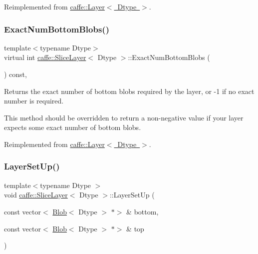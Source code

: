 Reimplemented from \mbox{\hyperlink{classcaffe_1_1_layer_a8e5ee0494d85f5f55fc4396537cbc60f}{caffe\+::\+Layer$<$ Dtype $>$}}.

\mbox{\label{classcaffe_1_1_slice_layer_abfc6e86b0b22c156ddc350168cd7757b}} 
\subsubsection{\texorpdfstring{Exact\+Num\+Bottom\+Blobs()}{ExactNumBottomBlobs()}\hspace{0.1cm}{\footnotesize\ttfamily [2/2]}}
{\footnotesize\ttfamily template$<$typename Dtype$>$ \\
virtual int \mbox{\hyperlink{classcaffe_1_1_slice_layer}{caffe\+::\+Slice\+Layer}}$<$ Dtype $>$\+::Exact\+Num\+Bottom\+Blobs (\begin{DoxyParamCaption}{ }\end{DoxyParamCaption}) const\hspace{0.3cm}{\ttfamily [inline]}, {\ttfamily [virtual]}}



Returns the exact number of bottom blobs required by the layer, or -\/1 if no exact number is required. 

This method should be overridden to return a non-\/negative value if your layer expects some exact number of bottom blobs. 

Reimplemented from \mbox{\hyperlink{classcaffe_1_1_layer_a8e5ee0494d85f5f55fc4396537cbc60f}{caffe\+::\+Layer$<$ Dtype $>$}}.

\mbox{\label{classcaffe_1_1_slice_layer_a92c1cdabdce4c92b9a4ee58e2ceb601e}} 
\subsubsection{\texorpdfstring{Layer\+Set\+Up()}{LayerSetUp()}\hspace{0.1cm}{\footnotesize\ttfamily [1/2]}}
{\footnotesize\ttfamily template$<$typename Dtype $>$ \\
void \mbox{\hyperlink{classcaffe_1_1_slice_layer}{caffe\+::\+Slice\+Layer}}$<$ Dtype $>$\+::Layer\+Set\+Up (\begin{DoxyParamCaption}\item[{const vector$<$ \mbox{\hyperlink{classcaffe_1_1_blob}{Blob}}$<$ Dtype $>$ $\ast$$>$ \&}]{bottom,  }\item[{const vector$<$ \mbox{\hyperlink{classcaffe_1_1_blob}{Blob}}$<$ Dtype $>$ $\ast$$>$ \&}]{top }\end{DoxyParamCaption})\hspace{0.3cm}{\ttfamily [virtual]}}




